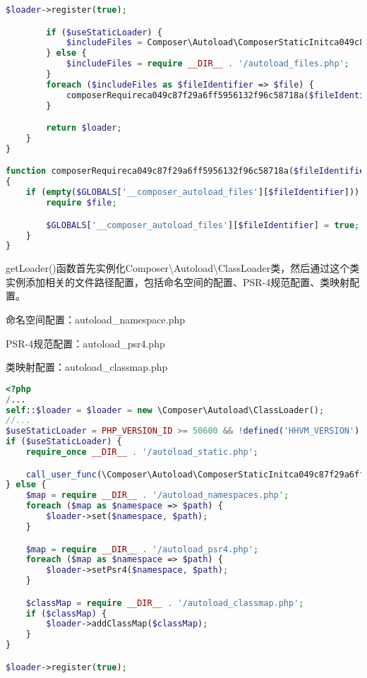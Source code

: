 \begin{lstlisting}[language=PHP]
        $loader->register(true);

        if ($useStaticLoader) {
            $includeFiles = Composer\Autoload\ComposerStaticInitca049c87f29a6ff5956132f96c58718a::$files;
        } else {
            $includeFiles = require __DIR__ . '/autoload_files.php';
        }
        foreach ($includeFiles as $fileIdentifier => $file) {
            composerRequireca049c87f29a6ff5956132f96c58718a($fileIdentifier, $file);
        }

        return $loader;
    }
}

function composerRequireca049c87f29a6ff5956132f96c58718a($fileIdentifier, $file)
{
    if (empty($GLOBALS['__composer_autoload_files'][$fileIdentifier])) {
        require $file;

        $GLOBALS['__composer_autoload_files'][$fileIdentifier] = true;
    }
}
\end{lstlisting}

getLoader()函数首先实例化Composer\textbackslash Autoload\textbackslash ClassLoader类，然后通过这个类实例添加相关的文件路径配置，包括命名空间的配置、PSR-4规范配置、类映射配置。

\begin{compactitem}
\item 命名空间配置：autoload\_namespace.php
\item PSR-4规范配置：autoload\_psr4.php
\item 类映射配置：autoload\_classmap.php
\end{compactitem}


\begin{lstlisting}[language=PHP]
<?php
/...
self::$loader = $loader = new \Composer\Autoload\ClassLoader();
//...
$useStaticLoader = PHP_VERSION_ID >= 50600 && !defined('HHVM_VERSION');
if ($useStaticLoader) {
    require_once __DIR__ . '/autoload_static.php';

    call_user_func(\Composer\Autoload\ComposerStaticInitca049c87f29a6ff5956132f96c58718a::getInitializer($loader));
} else {
    $map = require __DIR__ . '/autoload_namespaces.php';
    foreach ($map as $namespace => $path) {
        $loader->set($namespace, $path);
    }

    $map = require __DIR__ . '/autoload_psr4.php';
    foreach ($map as $namespace => $path) {
        $loader->setPsr4($namespace, $path);
    }

    $classMap = require __DIR__ . '/autoload_classmap.php';
    if ($classMap) {
        $loader->addClassMap($classMap);
    }
}

$loader->register(true);
\end{lstlisting}

